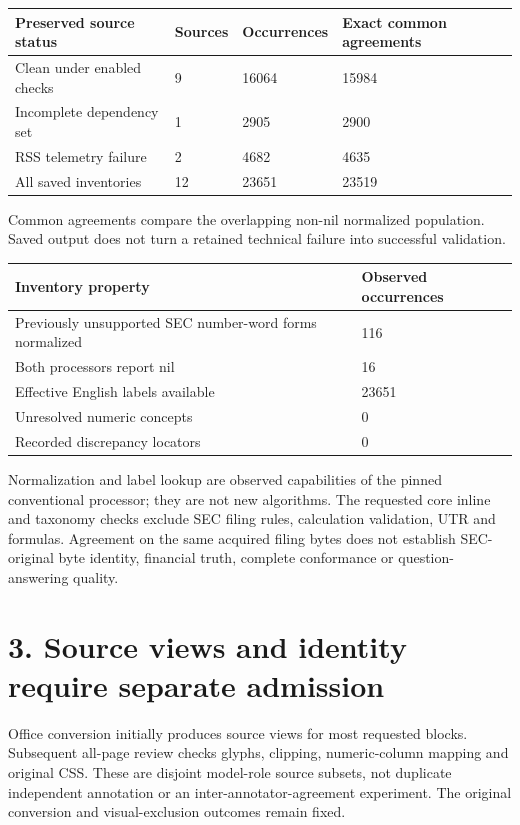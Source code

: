 \documentclass[10pt,a4paper]{article}
\begin{document}
\begin{longtable}{@{}p{}p{}p{}p{}@{}}\toprule
\textbf{Preserved source status} & \textbf{Sources} & \textbf{Occurrences} & \textbf{Exact common agreements} \\ \midrule\endhead
Clean under enabled checks & 9 & 16064 & 15984 \\
Incomplete dependency set & 1 & 2905 & 2900 \\
RSS telemetry failure & 2 & 4682 & 4635 \\
All saved inventories & 12 & 23651 & 23519 \\
\bottomrule\end{longtable}
{\small Common agreements compare the overlapping non-nil normalized population. Saved output does not turn a retained technical failure into successful validation.}
\begin{longtable}{@{}p{}p{}@{}}\toprule
\textbf{Inventory property} & \textbf{Observed occurrences} \\ \midrule\endhead
Previously unsupported SEC number-word forms normalized & 116 \\
Both processors report nil & 16 \\
Effective English labels available & 23651 \\
Unresolved numeric concepts & 0 \\
Recorded discrepancy locators & 0 \\
\bottomrule\end{longtable}
{\small Normalization and label lookup are observed capabilities of the pinned conventional processor; they are not new algorithms.}
The requested core inline and taxonomy checks exclude SEC filing rules, calculation validation, UTR and formulas. Agreement on the same acquired filing bytes does not establish SEC-original byte identity, financial truth, complete conformance or question-answering quality.

\clearpage
\section*{3. Source views and identity require separate admission}
Office conversion initially produces source views for most requested blocks. Subsequent all-page review checks glyphs, clipping, numeric-column mapping and original CSS. These are disjoint model-role source subsets, not duplicate independent annotation or an inter-annotator-agreement experiment. The original conversion and visual-exclusion outcomes remain fixed.
\end{document}
